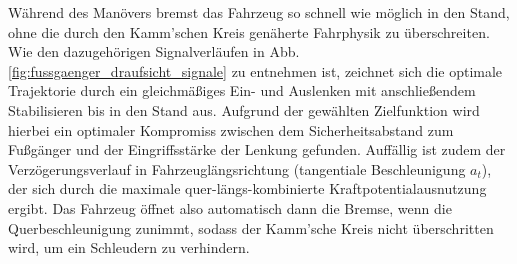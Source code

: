 Während des Manövers bremst das Fahrzeug so schnell wie möglich in den Stand, ohne die durch den Kamm'schen Kreis genäherte Fahrphysik zu überschreiten. Wie den dazugehörigen Signalverläufen in Abb.\,\ref{fig:fussgaenger_draufsicht_signale} zu entnehmen ist, zeichnet sich die optimale Trajektorie durch ein gleichmäßiges Ein- und Auslenken mit anschließendem Stabilisieren bis in den Stand aus. Aufgrund der gewählten Zielfunktion wird hierbei ein optimaler Kompromiss zwischen dem Sicherheitsabstand zum Fußgänger und der Eingriffsstärke der Lenkung gefunden. Auffällig ist zudem der Verzögerungsverlauf in Fahrzeuglängsrichtung (tangentiale Beschleunigung $a_t$), der sich durch die maximale quer-längs-kombinierte Kraftpotentialausnutzung ergibt. Das Fahrzeug öffnet also automatisch dann die Bremse, wenn die Querbeschleunigung zunimmt, sodass der Kamm'sche Kreis nicht überschritten wird, um ein Schleudern zu verhindern.


%






